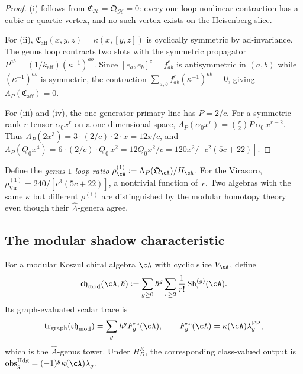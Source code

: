 \begin{proof}
\textup{(i)} follows from
$\mathfrak C_{\mathcal H}=\mathfrak Q_{\mathcal H}=0$: every
one-loop nonlinear contraction has a cubic or quartic vertex, and no
such vertex exists on the Heisenberg slice.

For \textup{(ii)}, $\mathfrak C_{\mathrm{aff}}(x,y,z)=\kappa(x,[y,z])$ is
cyclically symmetric by ad-invariance. The genus loop contracts two slots
with the symmetric propagator
$P^{ab}=(1/k_{\mathrm{eff}})(\kappa^{-1})^{ab}$. Since
$[e_a,e_b]^c = f^c_{ab}$ is antisymmetric in $(a,b)$ while
$(\kappa^{-1})^{ab}$ is symmetric, the contraction
$\sum_{a,b}f^c_{ab}(\kappa^{-1})^{ab}=0$, giving
$\Lambda_P(\mathfrak C_{\mathrm{aff}})=0$.

For \textup{(iii)} and \textup{(iv)}, the one-generator primary line has $P=2/c$. For a symmetric rank-$r$ tensor $\alpha_0 x^r$ on a one-dimensional space, $\Lambda_P(\alpha_0 x^r)=\binom{r}{2}P\,\alpha_0\,x^{r-2}$. Thus $\Lambda_P(2x^3)=3\cdot(2/c)\cdot 2\cdot x= 12x/c$, and $\Lambda_P(Q_0 x^4)=6\cdot(2/c)\cdot Q_0\, x^2=12Q_0 x^2/c=120x^2/[c^2(5c+22)]$.\qedhere
\end{proof}

\begin{remark}
\label{rem:nms-modular-invariant-ratio}
Define the \emph{genus-$1$ loop ratio}
$\rho^{(1)}_{\cA}:=\Lambda_P(\mathfrak Q_{\cA})/H_{\cA}$.
For the Virasoro, $\rho^{(1)}_{\mathrm{Vir}}=240/[c^3(5c+22)]$, a nontrivial function of~$c$. Two algebras with the same $\kappa$ but different $\rho^{(1)}$ are distinguished by the modular homotopy theory even though their $\hat{A}$-genera agree.
\end{remark}

\subsection{The modular shadow characteristic}
\label{subsec:nms-modular-chern-character}

\begin{definition}
\label{def:nms-full-modular-shadow-characteristic}
For a modular Koszul chiral algebra $\cA$ with cyclic slice $V_{\cA}$, define
\begin{equation}
\label{eq:nms-modular-shadow-characteristic}
\mathfrak{ch}_{\mathrm{mod}}(\cA;\hbar)
:=
\sum_{g\ge 0}\hbar^g\sum_{r\ge 2}\frac{1}{r!}\,\mathrm{Sh}_r^{(g)}(\cA).
\end{equation}
Its graph-evaluated scalar trace is
\[
 \operatorname{tr}_{\mathrm{graph}}(\mathfrak{ch}_{\mathrm{mod}})
 =\sum_g\hbar^g F_g^{\mathrm{sc}}(\cA),
 \qquad
 F_g^{\mathrm{sc}}(\cA)=\kappa(\cA)\lambda_g^{\mathrm{FP}},
\]
which is the $\hat A$-genus tower.  Under $H_D^K$, the corresponding
class-valued output is
$\operatorname{obs}^{\mathrm{Hdg}}_g
=(-1)^g\kappa(\cA)\lambda_g$.
\end{definition}

